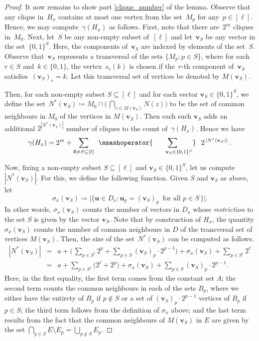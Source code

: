 \documentclass[11pt, final]{article}
\theoremstyle{definition}
\newcommand{\vv}{\textbf{v}}
\begin{document}
\begin{proof}
It now remains to show part \ref{clique_number} of the lemma. Observe that any clique in~$H_x$ contains at most one vertex from the set~$M_p$ for any~$p \in [\ell]$. Hence, we may compute~$\gamma(H_x)$ as follows. First, note that there are~$2^{m}$ cliques in~$M_0$. Next, let~$S$ be any non-empty subset of~$[\ell]$ and let~$\vv_S$ be any vector in the set~$\{0,1\}^S$. Here, the components of~$\vv_S$ are indexed by elements of the set~$S$. Observe that~$\vv_S$ represents a transversal of the sets $\{M_p : p \in S\}$, where for each~$r \in S$ and~$k \in \{0,1\}$, the vertex~$s_r(k)$ is chosen if the~$r$-th component of~$\vv_S$ satisfies~$(\vv_S)_r = k$. Let this transversal set of vertices be denoted by $M(\vv_S)$. 

Then, for each non-empty subset $S\subseteq [\ell]$ and for each vector $\vv_S \in \{0,1\}^S$, we define the set~$N^*(\vv_S) \coloneqq M_0\cap \bigl(\,\bigcap_{z\in M(\vv_S)} N(z)\bigr)$ to be the set of common neighbours in $M_0$ of the vertices in $M(\vv_S)$. Then each such $\vv_S$ adds an additional $2^{|N^*(\vv_S)|}$ number of cliques to the count of~$\gamma(H_x)$. Hence we have 
\begin{equation}
    \gamma(H_x) = 2^{m}+\sum _{\emptyset \neq S \subseteq [\ell]}\:\: \smashoperator{\sum_{\mkern 40mu\vv_S\in \{0,1\}^S}}\:\:\; 2^{\,|N^*(\vv_S)|}\,.\label{eq2}
\end{equation}

Now, fixing a non-empty subset $S \subseteq [\ell]$ and $\vv_S \in \{0,1\}^S$, let us compute $|N^*(\vv_S)|$. For this, we define the following function. Given $S$ and $\vv_S$ as above, let $$\sigma_x(\vv_S) \coloneqq \bigl| \{\textbf{u} \in D_x : \textbf{u}_p = (\vv_S)_p\, \text{ for all } p\in S\,\}\bigr|.$$
In other words, $\sigma_x(\vv_S)$ counts the number of vectors in $D_x$ whose \emph{restriction} to the set $S$ is given by the vector $\vv_S$. Note that by construction of $H_x$, the quantity $\sigma_x(\vv_S)$ counts the number of common neighbours in $D$ of the transversal set of vertices $M(\vv_S)$. Then, the size of the set~$N^*(\vv_S)$ can be computed as follows. 
\begin{eqnarray*}
    |N^*(\vv_S)| &=&  a + \biggl(\,\sum_{p\in S^c} 2^{p} + \sum_{p\in S} (\vv_S)_p\cdot 2^{p-1}\biggr) + \sigma_x(\vv_S) +  \sum_{p\in S^c} 2^\ell\\ &=& a + \sum_{p\in S^c}\bigl(2^\ell+2^p\bigr) + \sigma_x(\vv_S)+\sum_{p\in S}(\vv_S)_p\cdot 2^{p-1}.
\end{eqnarray*}
Here, in the first equality, the first term comes from the constant set $A$; the second term counts the common neighbours in each of the sets $B_p$, where we either have the entirety of $B_p$ if $p\notin S$ or a set of $(\vv_S)_p \cdot 2^{p-1}$ vertices of $B_p$ if $p \in S$; the third term follows from the definition of $\sigma_x$ above; and the last term results from the fact that the common neighbours of $M(\vv_S)$ in $E$ are given by the set $\bigcap_{p \in S} E \setminus E_p = \bigcup_{p \notin S} E_p$. 


\end{proof}
\end{document}
